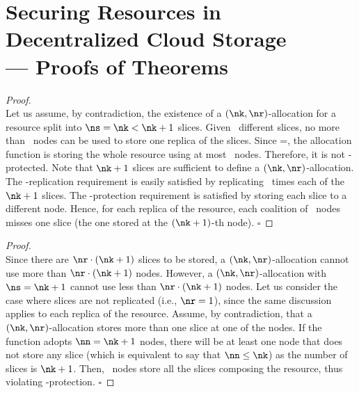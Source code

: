 \chapter[Decentralized Cloud Storage --- Proofs of Theorems]{Securing Resources in Decentralized Cloud Storage\\--- Proofs of Theorems}
\label{dcs:sec:proofs}

\begin{proof}
	\hfill\\
	Let us assume, by contradiction, the existence of a
    $(\nk,\nr)$-allocation for a resource split into $\ns = \nk <
    \nk +1$ slices. Given \ns\ different slices, no more than
    \ns\ nodes can be used to store one replica of the
    slices. Since \ns=\nk, the allocation function is storing the
    whole resource using at most \nk\ nodes. Therefore, it is not
    \nk-protected.  Note that $\nk + 1$ slices are sufficient to
    define a $(\nk,\nr)$-allocation. The \nr-replication
    requirement is easily satisfied by replicating \nr\ times each
    of the $\nk + 1$ slices. The \nk-protection requirement is
    satisfied by storing each slice to a different node. Hence,
    for each replica of the resource, each coalition of \nk\ nodes
    misses one slice (the one stored at the $(\nk+1)$-th
    node).
    {\hfill $\square$}
\end{proof}

\medskip

\begin{proof}
	\hfill\\
	Since there are $\nr \cdot (\nk+1)$ slices to be stored, a
    $(\nk,\nr)$-allocation cannot use more than $\nr \cdot
    (\nk+1)$ nodes.  However, a $(\nk,\nr)$-allocation with
    $\ns=\nk+1$ cannot use less than $\nr \cdot (\nk+1)$
    nodes. Let us consider the case where slices are not
    replicated (i.e., $\nr=1$), since the same discussion applies
    to each replica of the resource. Assume, by contradiction,
    that a $(\nk,\nr)$-allocation stores more than one slice at
    one of the nodes. If the function adopts $\nn=\nk+1$ nodes,
    there will be at least one node that does not store any slice
    (which is equivalent to say that $\nn \leq \nk$) as the number
    of slices is $\nk+1$.  Then, \nk\ nodes store all the slices
    composing the resource, thus violating \nk-protection.
    {\hfill $\square$}
\end{proof}

\medskip

